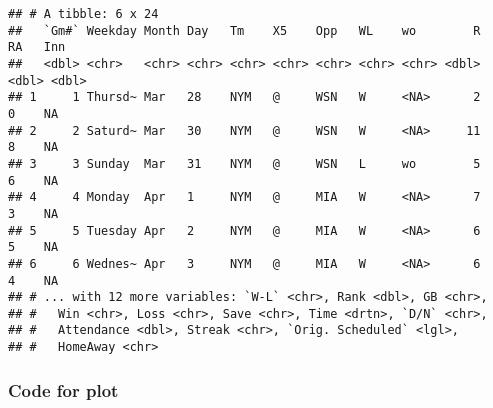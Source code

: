 \documentclass[]{book}
\begin{document}
\begin{verbatim}
## # A tibble: 6 x 24
##   `Gm#` Weekday Month Day   Tm    X5    Opp   WL    wo        R    RA   Inn
##   <dbl> <chr>   <chr> <chr> <chr> <chr> <chr> <chr> <chr> <dbl> <dbl> <dbl>
## 1     1 Thursd~ Mar   28    NYM   @     WSN   W     <NA>      2     0    NA
## 2     2 Saturd~ Mar   30    NYM   @     WSN   W     <NA>     11     8    NA
## 3     3 Sunday  Mar   31    NYM   @     WSN   L     wo        5     6    NA
## 4     4 Monday  Apr   1     NYM   @     MIA   W     <NA>      7     3    NA
## 5     5 Tuesday Apr   2     NYM   @     MIA   W     <NA>      6     5    NA
## 6     6 Wednes~ Apr   3     NYM   @     MIA   W     <NA>      6     4    NA
## # ... with 12 more variables: `W-L` <chr>, Rank <dbl>, GB <chr>,
## #   Win <chr>, Loss <chr>, Save <chr>, Time <drtn>, `D/N` <chr>,
## #   Attendance <dbl>, Streak <chr>, `Orig. Scheduled` <lgl>,
## #   HomeAway <chr>
\end{verbatim}

\hypertarget{metsbarcode}{%
\subsubsection*{Code for plot}\label{metsbarcode}}
\end{document}
